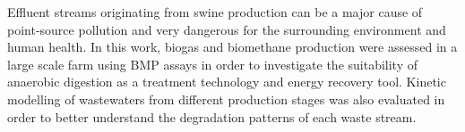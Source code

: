 Effluent streams originating from swine production can be a major cause of point-source pollution and very dangerous for the surrounding environment and human health. In this work, biogas and biomethane production were assessed in a large scale farm using BMP assays in order to investigate the suitability of anaerobic digestion as a treatment technology and energy recovery tool. Kinetic modelling of wastewaters from different production stages was also evaluated in order to better understand the degradation patterns of each waste stream.